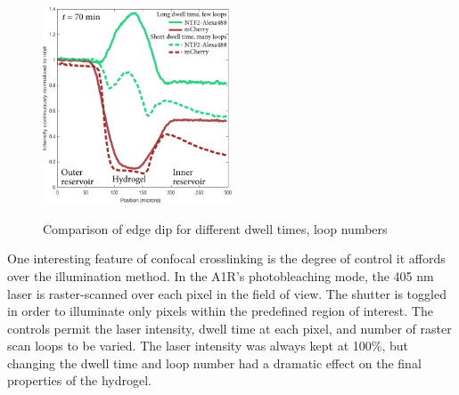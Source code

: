 \begin{figure} %
\caption{Comparison of edge dip for different dwell times, loop numbers}
\centering
\includegraphics[width=0.5\textwidth]{figs/ch03/dwell-time-effect}
\label{fig:dwell-time-effect}
\end{figure} %

One interesting feature of confocal crosslinking is the degree of control it affords over the illumination method.  In the A1R's photobleaching mode, the 405 nm laser is raster-scanned over each pixel in the field of view.  The shutter is toggled in order to illuminate only pixels within the predefined region of interest.  The controls permit the laser intensity, dwell time at each pixel, and number of raster scan loops to be varied.  The laser intensity was always kept at 100\%, but changing the dwell time and loop number had a dramatic effect on the final properties of the hydrogel.

